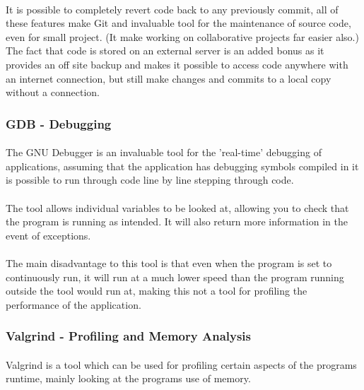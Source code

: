 \paragraph{}
It is possible to completely revert code back to any previously commit, all of these features make Git and invaluable tool for the maintenance of source code, even for small project. (It make working on collaborative projects far easier also.) The fact that code is stored on an external server is an added bonus as it provides an off site backup and makes it possible to access code anywhere with an internet connection, but still make changes and commits to a local copy without a connection.

\subsubsection{GDB - Debugging}
\paragraph{}
The GNU Debugger is an invaluable tool for the 'real-time' debugging of applications, assuming that the application has debugging symbols compiled in it is possible to run through code line by line stepping through code.

\paragraph{}
The tool allows individual variables to be looked at, allowing you to check that the program is running as intended. It will also return more information in the event of exceptions.

\paragraph{}
The main disadvantage to this tool is that even when the program is set to continuously run, it will run at a much lower speed than the program running outside the tool would run at, making this not a tool for profiling the performance of the application.

\subsubsection{Valgrind - Profiling and Memory Analysis}
\paragraph{}
Valgrind is a tool which can be used for profiling certain aspects of the programs runtime, mainly looking at the programs use of memory.

